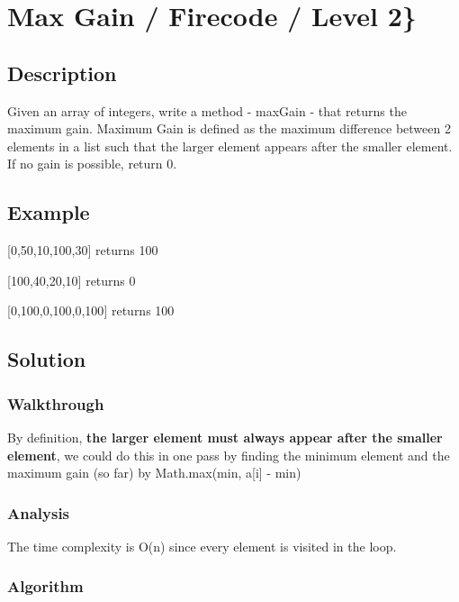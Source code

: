 \documentclass[]{book}
\begin{document}
\hypertarget{max-gain-firecode-level-2}{%
\section{Max Gain / Firecode / Level 2\}}\label{max-gain-firecode-level-2}}

\hypertarget{description-9}{%
\subsection{Description}\label{description-9}}

Given an array of integers, write a method - maxGain - that returns the maximum gain. Maximum Gain is defined as the
maximum difference between 2 elements in a list such that the larger element appears after the smaller element. If no
gain is possible, return 0.

\hypertarget{example-8}{%
\subsection{Example}\label{example-8}}

{[}0,50,10,100,30{]} returns 100

{[}100,40,20,10{]} returns 0

{[}0,100,0,100,0,100{]} returns 100

\hypertarget{solution-7}{%
\subsection{Solution}\label{solution-7}}

\hypertarget{walkthrough-9}{%
\subsubsection{Walkthrough}\label{walkthrough-9}}

By definition, \textbf{the larger element must always appear after the smaller element}, we could do this in one pass
by finding the minimum element and the maximum gain (so far) by Math.max(min, a{[}i{]} - min)

\hypertarget{analysis-10}{%
\subsubsection{Analysis}\label{analysis-10}}

The time complexity is O(n) since every element is visited in the loop.

\hypertarget{algorithm-10}{%
\subsubsection{Algorithm}\label{algorithm-10}}
\end{document}
